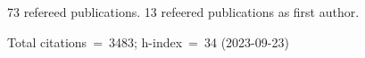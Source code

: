 73 refereed publications. 13 refeered publications as first author.

Total citations~=~3483; h-index~=~34 (2023-09-23)
